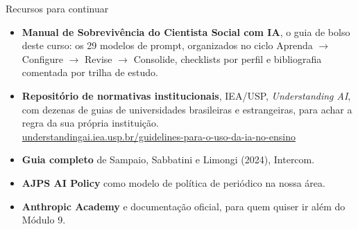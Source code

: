 \documentclass[11pt,aspectratio=169,t]{beamer}
\begin{document}
\begin{frame}{Recursos para continuar}
  \small
  \begin{itemize}
    \item \textbf{Manual de Sobrevivência do Cientista Social com IA}, o guia de bolso deste curso: os 29 modelos de prompt, organizados no ciclo Aprenda $\rightarrow$ Configure $\rightarrow$ Revise $\rightarrow$ Consolide, checklists por perfil e bibliografia comentada por trilha de estudo.
    \item \textbf{Repositório de normativas institucionais}, IEA/USP, \textit{Understanding AI}, com dezenas de guias de universidades brasileiras e estrangeiras, para achar a regra da sua própria instituição.\\
    \scriptsize\url{understandingai.iea.usp.br/guidelines-para-o-uso-da-ia-no-ensino}
    \item \small\textbf{Guia completo} de Sampaio, Sabbatini e Limongi (2024), Intercom.
    \item \textbf{AJPS AI Policy} como modelo de política de periódico na nossa área.
    \item \textbf{Anthropic Academy} e documentação oficial, para quem quiser ir além do Módulo 9.
  \end{itemize}
\end{frame}
\end{document}
